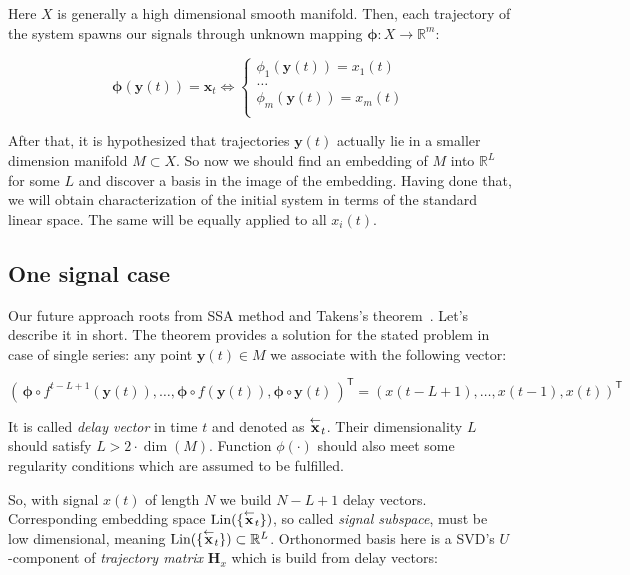 	Here $ X $ is generally a high dimensional smooth manifold. Then, each trajectory of the system spawns our signals through unknown mapping $ \boldsymbol{\phi}: X \to \mathbb{R}^m $:
	
	\begin{equation*}
		\boldsymbol{\phi}(\mathbf{y}(t)) = \mathbf{x}_t \Leftrightarrow \begin{cases}
			\phi_1(\mathbf{y}(t)) = x_1(t) \\
			\ldots \\
			\phi_m(\mathbf{y}(t)) = x_m(t) \\
		\end{cases}
	\end{equation*}
	
	After that, it is hypothesized that trajectories $ \mathbf{y}(t) $ actually lie in a smaller dimension manifold $ M \subset X $. So now we should find an embedding of $ M $ into $ \mathbb{R}^{L} $ for some $ L $ and discover a basis in the image of the embedding. Having done that, we will obtain characterization of the initial system in terms of the standard linear space. The same will be equally applied to all $ x_i(t) $.
	
	\subsection*{One signal case}
	
	Our future approach roots from SSA method and Takens's theorem~\cite{citeulike:2735031}. Let's describe it in short. The theorem provides a solution for the stated problem in case of single series: any point $ \mathbf{y}(t) \in M $ we associate with the following vector:
	
	\[
	( \, \boldsymbol{\phi} \circ f^{t - L + 1}(\mathbf{y}(t)), \ldots , \boldsymbol{\phi} \circ f(\mathbf{y}(t)), \boldsymbol{\phi} \circ \mathbf{y}(t) \,)^{\mathsf{T}} = (x(t - L + 1), \ldots , x(t-1), x(t))^{\mathsf{T}}
	\] 
	
	It is called \emph{delay vector} in time $ t $ and denoted as $ \overset{\leftarrow}{\mathbf{x}}_{t} $. Their dimensionality $ L $ should satisfy $ L > 2 \cdot \dim(M) $. Function $ \phi(\cdot) $ should also meet some regularity conditions which are assumed to be fulfilled.
	
	So, with signal $ x(t) $ of length $ N $ we build $ N - L + 1 $ delay vectors. Corresponding embedding space $ \text{Lin}(\{\overset{\leftarrow}{\mathbf{x}}_{t}\}) $, so called \emph{signal subspace}, must be low dimensional, meaning $ \text{Lin}(\{\overset{\leftarrow}{\mathbf{x}}_{t}\}) \subset \mathbb{R}^L $. Orthonormed basis here is a SVD's $ U $-component of \emph{trajectory matrix} $ \mathbf{H}_x $ which is build from delay vectors:
	
